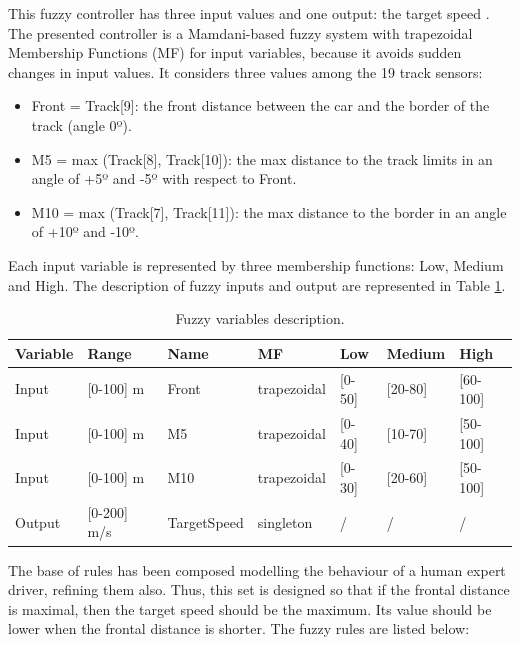 \documentclass[runningheads,a4paper]{llncs}
\begin{document}
This fuzzy controller has three input values and one output: the target speed .
The presented controller is a Mamdani-based fuzzy system \cite{iancu2012} with trapezoidal Membership Functions (MF) for input variables, because it avoids sudden changes in input values. It considers three values among the 19 track sensors:

\begin{itemize}
	\item Front = Track[9]: the front distance between the car and the border of the track (angle 0º).
	\item M5 = max (Track[8], Track[10]): the max distance to the track limits in an angle of +5º and -5º with respect to Front.
	\item M10 = max (Track[7], Track[11]): the max distance to the border in an angle of +10º and -10º.
\end{itemize}


Each input variable is represented by three membership functions: Low, Medium and High. The description of fuzzy inputs and output are represented in Table \ref{tab:flouevar}.

\begin{table}
	\caption{Fuzzy variables description.}
	\label{tab:flouevar}
	\begin{tabular}{ |p{1.5cm}|p{2cm}|p{2cm}|p{2 cm}|p{1 cm}|p{1.5 cm}|p{1.5 cm}|}
		\hline
		{ \color{red} Variable }&
		{ \color{red} Range }&
		{ \color{red} Name}&  
		{ \color{red} MF } &
		{ \color{red} Low } &
		{ \color{red} Medium }&
		{ \color{red} High } 
		
		\\
		\hline
		\hline
		Input & [0-100] m & Front & trapezoidal & [0-50] & [20-80] & [60-100]
		\\
		\hline
		Input & [0-100] m & M5 & trapezoidal &[0-40] & [10-70] & [50-100] 
		\\
		\hline
		Input & [0-100] m  & M10 & trapezoidal & [0-30] & [20-60] & [50-100]
		\\
		\hline 
		Output & [0-200] m/s & TargetSpeed & singleton & / & / & /
		\\
		\hline 
	\end{tabular} 
\end{table}

The base of rules has been composed modelling the behaviour of a human expert driver, refining them also. Thus, this set is designed so that if the frontal distance is maximal, then the target speed should be the maximum. Its value should be lower when the frontal distance is shorter. 
The fuzzy rules are listed below:
\end{document}
